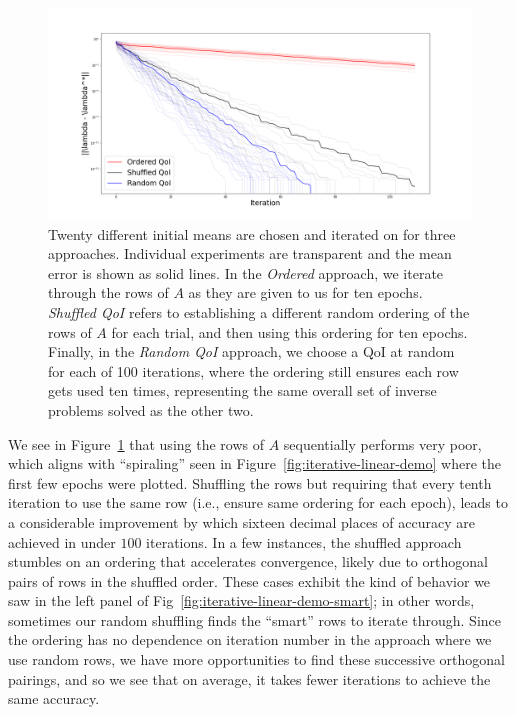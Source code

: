 \begin{figure}
  \centering
  \includegraphics[width=0.95\linewidth]{examples/iterative/10D-convergence-comparison}
  \caption{
  Twenty different initial means are chosen and iterated on for three approaches.
  Individual experiments are transparent and the mean error is shown as solid lines.
  In the \emph{Ordered} approach, we iterate through the rows of $A$ as they are given to us for ten epochs.
  \emph{Shuffled QoI} refers to establishing a different random ordering of the rows of $A$ for each trial, and then
  using this ordering for ten epochs.
  Finally, in the \emph{Random QoI} approach, we choose a QoI at random for each of 100 iterations, where the ordering still ensures each row gets used ten times, representing the same overall set of inverse problems solved as the other two.
  }
  \label{fig:iterative-convergence-comparison}
\end{figure}

We see in Figure~\ref{fig:iterative-convergence-comparison} that using the rows of $A$ sequentially performs very poor, which aligns with ``spiraling'' seen in Figure~\ref{fig:iterative-linear-demo} where the first few epochs were plotted.
Shuffling the rows but requiring that every tenth iteration to use the same row (i.e., ensure same ordering for each epoch), leads to a considerable improvement by which sixteen decimal places of accuracy are achieved in under $100$ iterations.
In a few instances, the shuffled approach stumbles on an ordering that accelerates convergence, likely due to orthogonal pairs of rows in the shuffled order.
These cases exhibit the kind of behavior we saw in the left panel of Fig~\ref{fig:iterative-linear-demo-smart}; in other words, sometimes our random shuffling finds the ``smart'' rows to iterate through.
Since the ordering has no dependence on iteration number in the approach where we use random rows, we have more opportunities to find these successive orthogonal pairings, and so we see that on average, it takes fewer iterations to achieve the same accuracy.




